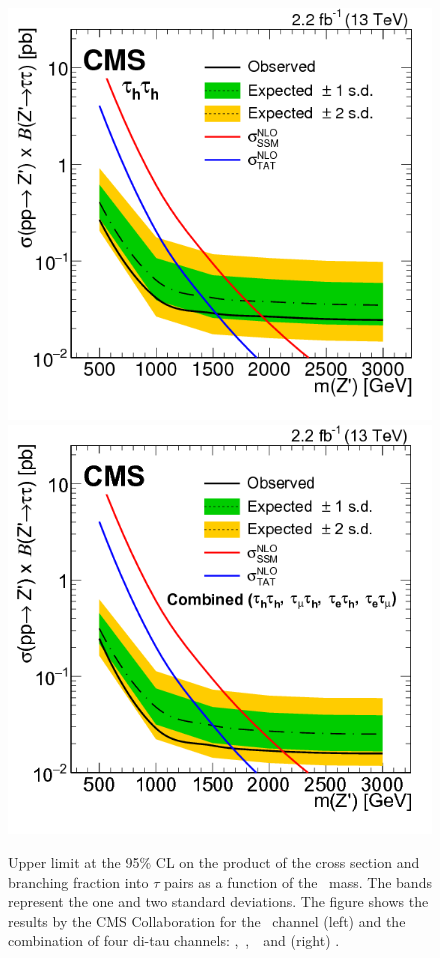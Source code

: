\begin{itemize}
\begin{center}
\begin{figure}[ht]
\centering
\includegraphics[scale=0.36]{figuras/Chapter1/CMSZprime2ditauhRun2.png}
\includegraphics[scale=0.36]{figuras/Chapter1/CMSZprimeditauRun2.png}
\caption{Upper limit at the 95$\%$ CL on the product of the cross section and
branching fraction into $\tau$ pairs as a function of the \Zprime~mass. The bands represent the
one and two standard deviations. The figure shows the results by the CMS Collaboration
for the \tauh \tauh~channel  (left) and the combination of four 
di-tau channels: \tauh \tauh,~\taue \tauh,~\taumu \tauh~and \taue \taumu (right) \cite{CMSZprimetotautau2015}.
} \label{CMSditauresult}
\end{figure}
\end{center}



\end{itemize}
